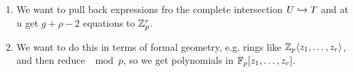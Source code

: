 \begin{enumerate}[1.]
\item We want to pull back expressions fro the complete intersection $U \hookrightarrow T$ and at $u$ get $g+\rho-2$ equations to $\mathbb{Z}_p^r$. 
\item We want to do this in terms of formal geometry, e.g. rings like $\mathbb{Z}_p \langle z_1,\ldots,z_r \rangle$, and then reduce $\mod p$, so we get polynomials in $\mathbb{F}_p[z_1,\ldots,z_r]$.
\end{enumerate}






















